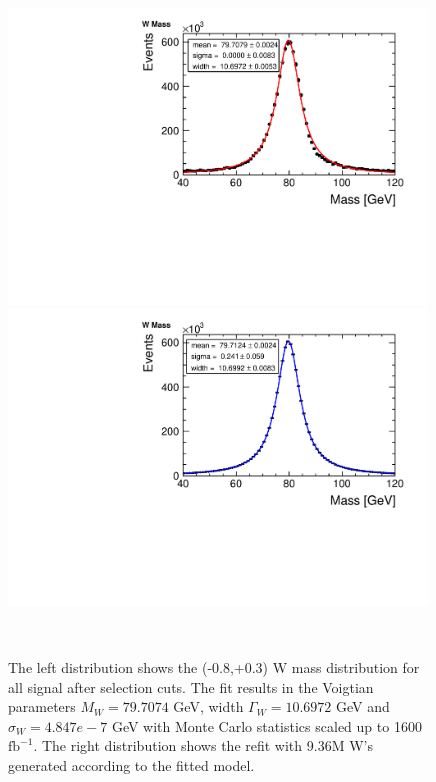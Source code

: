 \begin{figure}

\centering
    \begin{minipage}{0.49\textwidth}
        \centering
        \includegraphics[width=0.99\textwidth]{WWSfit.pdf} %
   
    \end{minipage}\hfill
    \begin{minipage}{0.49\textwidth}
        \centering
        \includegraphics[width=0.99\textwidth]{Wtoyfit.pdf} %
     
     \end{minipage}\\
     \caption{ The left distribution shows the (-0.8,+0.3) W mass distribution for all signal after selection cuts. The fit results in the Voigtian parameters $M_W = 79.7074$ GeV, width $\Gamma_W = 10.6972$ GeV and $\sigma_W = 4.847e-7$ GeV with Monte Carlo statistics scaled up to 1600 $\text{fb}^{-1}$. The right distribution shows the refit with 9.36M W's generated according to the fitted model.}
\label{fig:badfit}


\end{figure}


